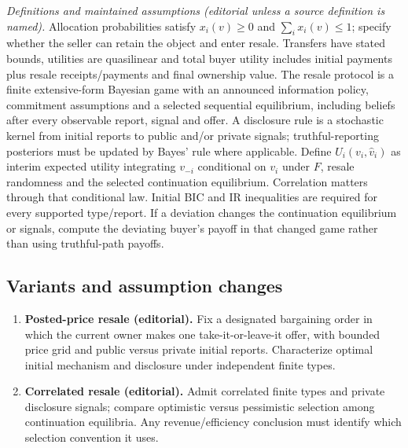 \documentclass[11pt,a4paper]{article}
\begin{document}
\emph{Definitions and maintained assumptions (editorial unless a source definition is named).} Allocation probabilities satisfy \(x_i(v)\ge0\) and \(\sum_i x_i(v)\le1\); specify whether the seller can retain the object and enter resale. Transfers have stated bounds, utilities are quasilinear and total buyer utility includes initial payments plus resale receipts/payments and final ownership value. The resale protocol is a finite extensive-form Bayesian game with an announced information policy, commitment assumptions and a selected sequential equilibrium, including beliefs after every observable report, signal and offer. A disclosure rule is a stochastic kernel from initial reports to public and/or private signals; truthful-reporting posteriors must be updated by Bayes’ rule where applicable. Define \(U_i(v_i,\hat v_i)\) as interim expected utility integrating \(v_{-i}\) conditional on \(v_i\) under \(F\), resale randomness and the selected continuation equilibrium. Correlation matters through that conditional law. Initial BIC and IR inequalities are required for every supported type/report. If a deviation changes the continuation equilibrium or signals, compute the deviating buyer’s payoff in that changed game rather than using truthful-path payoffs.
\subsection*{Variants and assumption changes}
\begin{enumerate}
\item \textbf{Posted-price resale (editorial).} Fix a designated bargaining order in which the current owner makes one take-it-or-leave-it offer, with bounded price grid and public versus private initial reports. Characterize optimal initial mechanism and disclosure under independent finite types.
\item \textbf{Correlated resale (editorial).} Admit correlated finite types and private disclosure signals; compare optimistic versus pessimistic selection among continuation equilibria. Any revenue/efficiency conclusion must identify which selection convention it uses.
\end{enumerate}
\end{document}
